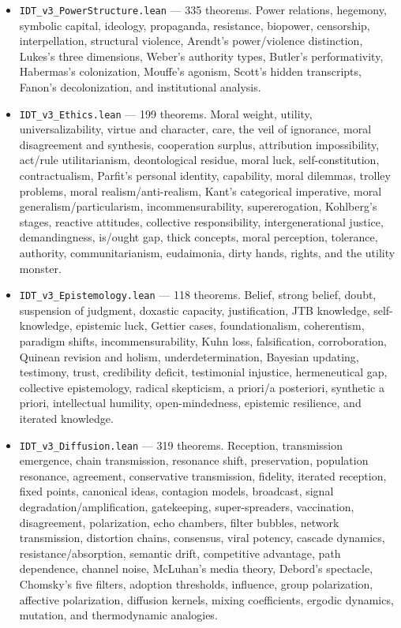 \documentclass[11pt,oneside]{book}
\theoremstyle{plain}
\theoremstyle{definition}
\theoremstyle{remark}
\begin{document}
\begin{itemize}
\item \texttt{IDT\_v3\_PowerStructure.lean} --- 335 theorems. Power relations,
hegemony, symbolic capital, ideology, propaganda, resistance, biopower,
censorship, interpellation, structural violence, Arendt's power/violence
distinction, Lukes's three dimensions, Weber's authority types, Butler's
performativity, Habermas's colonization, Mouffe's agonism, Scott's hidden
transcripts, Fanon's decolonization, and institutional analysis.

\item \texttt{IDT\_v3\_Ethics.lean} --- 199 theorems. Moral weight, utility,
universalizability, virtue and character, care, the veil of ignorance,
moral disagreement and synthesis, cooperation surplus, attribution
impossibility, act/rule utilitarianism, deontological residue, moral luck,
self-constitution, contractualism, Parfit's personal identity, capability,
moral dilemmas, trolley problems, moral realism/anti-realism, Kant's
categorical imperative, moral generalism/particularism, incommensurability,
supererogation, Kohlberg's stages, reactive attitudes, collective
responsibility, intergenerational justice, demandingness, is/ought gap,
thick concepts, moral perception, tolerance, authority, communitarianism,
eudaimonia, dirty hands, rights, and the utility monster.

\item \texttt{IDT\_v3\_Epistemology.lean} --- 118 theorems. Belief, strong
belief, doubt, suspension of judgment, doxastic capacity, justification,
JTB knowledge, self-knowledge, epistemic luck, Gettier cases, foundationalism,
coherentism, paradigm shifts, incommensurability, Kuhn loss, falsification,
corroboration, Quinean revision and holism, underdetermination, Bayesian
updating, testimony, trust, credibility deficit, testimonial injustice,
hermeneutical gap, collective epistemology, radical skepticism, a priori/a
posteriori, synthetic a priori, intellectual humility, open-mindedness,
epistemic resilience, and iterated knowledge.

\item \texttt{IDT\_v3\_Diffusion.lean} --- 319 theorems. Reception, transmission
emergence, chain transmission, resonance shift, preservation, population
resonance, agreement, conservative transmission, fidelity, iterated
reception, fixed points, canonical ideas, contagion models, broadcast,
signal degradation/amplification, gatekeeping, super-spreaders, vaccination,
disagreement, polarization, echo chambers, filter bubbles, network
transmission, distortion chains, consensus, viral potency, cascade
dynamics, resistance/absorption, semantic drift, competitive advantage,
path dependence, channel noise, McLuhan's media theory, Debord's spectacle,
Chomsky's five filters, adoption thresholds, influence, group polarization,
affective polarization, diffusion kernels, mixing coefficients, ergodic
dynamics, mutation, and thermodynamic analogies.
\end{itemize}
\end{document}
